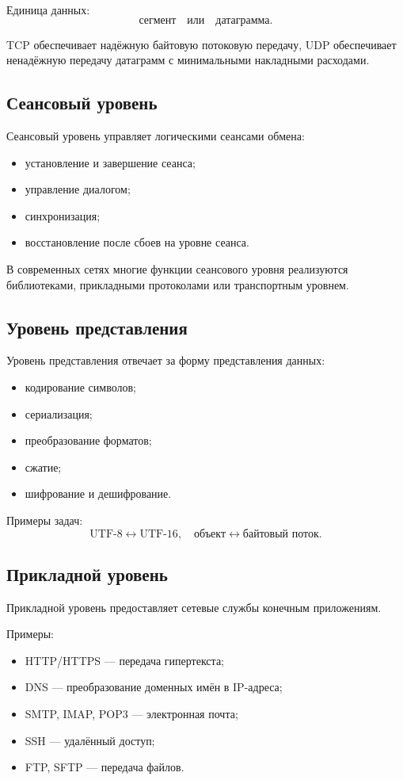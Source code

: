\documentclass[12pt,a4paper]{article}
\begin{document}
Единица данных:
\[
\text{сегмент} \quad \text{или} \quad \text{датаграмма}.
\]

TCP обеспечивает надёжную байтовую потоковую передачу, UDP обеспечивает ненадёжную передачу датаграмм с минимальными накладными расходами.

\subsection{Сеансовый уровень}

Сеансовый уровень управляет логическими сеансами обмена:
\begin{itemize}
    \item установление и завершение сеанса;
    \item управление диалогом;
    \item синхронизация;
    \item восстановление после сбоев на уровне сеанса.
\end{itemize}

В современных сетях многие функции сеансового уровня реализуются библиотеками, прикладными протоколами или транспортным уровнем.

\subsection{Уровень представления}

Уровень представления отвечает за форму представления данных:
\begin{itemize}
    \item кодирование символов;
    \item сериализация;
    \item преобразование форматов;
    \item сжатие;
    \item шифрование и дешифрование.
\end{itemize}

Примеры задач:
\[
\text{UTF-8} \leftrightarrow \text{UTF-16},
\quad
\text{объект} \leftrightarrow \text{байтовый поток}.
\]

\subsection{Прикладной уровень}

Прикладной уровень предоставляет сетевые службы конечным приложениям.

Примеры:
\begin{itemize}
    \item HTTP/HTTPS --- передача гипертекста;
    \item DNS --- преобразование доменных имён в IP-адреса;
    \item SMTP, IMAP, POP3 --- электронная почта;
    \item SSH --- удалённый доступ;
    \item FTP, SFTP --- передача файлов.
\end{itemize}
\end{document}
